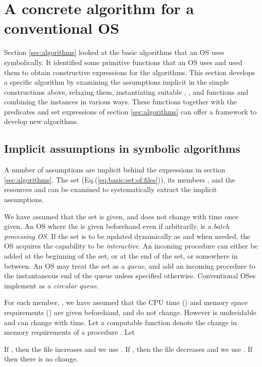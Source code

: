 \documentclass[draft]{article}
\begin{document}
\section{A concrete algorithm for a conventional OS}
\label{sec:algorithms:concrete}

Section \ref{sec:algorithms} looked at the basic algorithms that an OS
uses symbolically.  It identified  some primitive functions that an OS
uses  and  used  them  to  obtain  constructive  expressions  for  the
algorithms.  This  section develops a specific  algorithm by examining
the assumptions  implicit in the simple  constructions above, relaxing
them, instantiating  suitable ,  , and   functions and
combining  the instances  in various  ways.  These  functions together
with    the    predicates    and    set   expressions    of    section
\ref{sec:algorithms} can offer a framework to develop new algorithms.

\subsection{Implicit assumptions in symbolic algorithms}
\label{sec:algorithms:concrete:assumptions}

A number of assumptions are implicit behind the expressions in section
\ref{sec:algorithms}.  The set  (Eq.(\ref{eq:basic:set:of:files})),
its members  , and the resources   and  can  be examined to
systematically extract the implicit assumptions.

We have  assumed that the set   is given, and does  not change with
time once  given.  An  OS where  the  is  given beforehand  even if
arbitrarily, is a \emph{batch processing OS}.  If the set  is to be
updated dynamically as and when needed, the OS acquires the capability
to be  \emph{interactive}.  An incoming procedure can  either be added
at the beginning of the set, or at the end of the set, or somewhere in
between.  An  OS may treat the set   as a \emph{queue},  and add an
incoming  procedure  to the  instantaneous  end  of  the queue  unless
specified   otherwise.    Conventional  OSes   implement     as   a
\emph{circular queue}.   

For  each member,  ,  we have  assumed that  the CPU  time
()  and  memory  space  requirements  ()  are  given
beforehand, and  do not change.  However   is undecidable and
   can  change   with  time.    Let  a   computable  function
 denote the change in memory requirements of a procedure
.  Let

If , then the file increases and we use .  If
, then the file decreases and we use .  If
 then there is no change.
\end{document}
